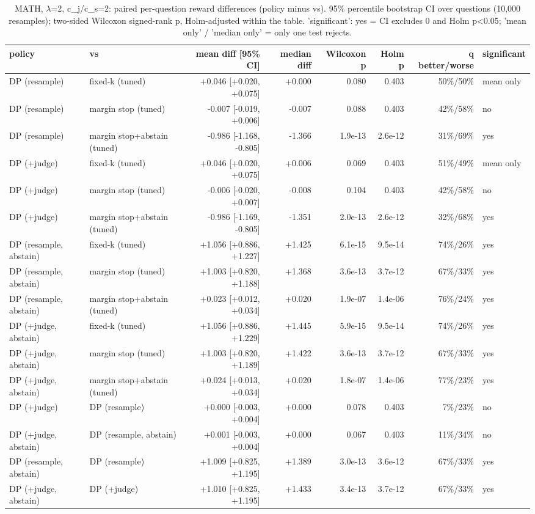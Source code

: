 \begin{table}[t]
\centering
\small
\caption{MATH, $\lambda$=2, c\_j/c\_s=2: paired per-question reward differences (policy minus vs). 95\% percentile bootstrap CI over questions (10,000 resamples); two-sided Wilcoxon signed-rank p, Holm-adjusted within the table. 'significant': yes = CI excludes 0 and Holm p<0.05; 'mean only' / 'median only' = only one test rejects.}
\label{tab:significance_math_lam2}
\begin{tabular}{llrrrrrl}
\toprule
policy & vs & mean diff [95\% CI] & median diff & Wilcoxon p & Holm p & q better/worse & significant \\
\midrule
DP (resample) & fixed-k (tuned) & +0.046 [+0.020, +0.075] & +0.000 & 0.080 & 0.403 & 50\%/50\% & mean only \\
DP (resample) & margin stop (tuned) & -0.007 [-0.019, +0.006] & -0.007 & 0.088 & 0.403 & 42\%/58\% & no \\
DP (resample) & margin stop+abstain (tuned) & -0.986 [-1.168, -0.805] & -1.366 & 1.9e-13 & 2.6e-12 & 31\%/69\% & yes \\
DP (+judge) & fixed-k (tuned) & +0.046 [+0.020, +0.075] & +0.006 & 0.069 & 0.403 & 51\%/49\% & mean only \\
DP (+judge) & margin stop (tuned) & -0.006 [-0.020, +0.007] & -0.008 & 0.104 & 0.403 & 42\%/58\% & no \\
DP (+judge) & margin stop+abstain (tuned) & -0.986 [-1.169, -0.805] & -1.351 & 2.0e-13 & 2.6e-12 & 32\%/68\% & yes \\
DP (resample, abstain) & fixed-k (tuned) & +1.056 [+0.886, +1.227] & +1.425 & 6.1e-15 & 9.5e-14 & 74\%/26\% & yes \\
DP (resample, abstain) & margin stop (tuned) & +1.003 [+0.820, +1.188] & +1.368 & 3.6e-13 & 3.7e-12 & 67\%/33\% & yes \\
DP (resample, abstain) & margin stop+abstain (tuned) & +0.023 [+0.012, +0.034] & +0.020 & 1.9e-07 & 1.4e-06 & 76\%/24\% & yes \\
DP (+judge, abstain) & fixed-k (tuned) & +1.056 [+0.886, +1.229] & +1.445 & 5.9e-15 & 9.5e-14 & 74\%/26\% & yes \\
DP (+judge, abstain) & margin stop (tuned) & +1.003 [+0.820, +1.189] & +1.422 & 3.6e-13 & 3.7e-12 & 67\%/33\% & yes \\
DP (+judge, abstain) & margin stop+abstain (tuned) & +0.024 [+0.013, +0.034] & +0.020 & 1.8e-07 & 1.4e-06 & 77\%/23\% & yes \\
DP (+judge) & DP (resample) & +0.000 [-0.003, +0.004] & +0.000 & 0.078 & 0.403 & 7\%/23\% & no \\
DP (+judge, abstain) & DP (resample, abstain) & +0.001 [-0.003, +0.004] & +0.000 & 0.067 & 0.403 & 11\%/34\% & no \\
DP (resample, abstain) & DP (resample) & +1.009 [+0.825, +1.195] & +1.389 & 3.0e-13 & 3.6e-12 & 67\%/33\% & yes \\
DP (+judge, abstain) & DP (+judge) & +1.010 [+0.825, +1.195] & +1.433 & 3.4e-13 & 3.7e-12 & 67\%/33\% & yes \\
\bottomrule
\end{tabular}
\end{table}
